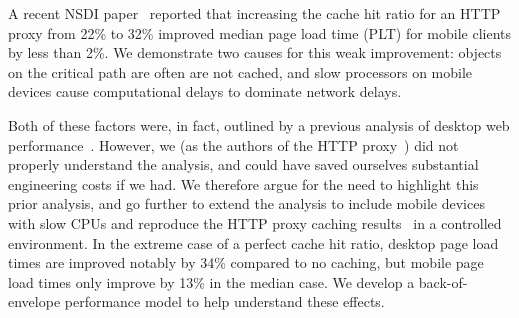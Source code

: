 A recent NSDI paper~\cite{flywheel} reported that
increasing the cache hit ratio for an HTTP proxy from 22\% to 32\% improved
median page load time (PLT) for mobile clients by less than 2\%.
We demonstrate two causes for this weak improvement:
objects on the critical path are often are not cached, and
slow processors on mobile devices cause computational delays to dominate network delays.

Both of
these factors were, in fact, outlined by a previous analysis of desktop
web performance~\cite{wang2013demystifying}. However, we (as the authors of the HTTP proxy~\cite{flywheel}) did not properly understand the analysis, and could have saved ourselves substantial engineering costs if we had. We therefore argue for the need to highlight this prior
analysis, and go further to extend the analysis
to include mobile devices with slow CPUs and reproduce the
HTTP proxy caching
results~\cite{flywheel} in a controlled environment. %
In the extreme case of a perfect cache hit ratio, desktop page load times are
improved notably by 34\% compared to no caching, but mobile page
load times only improve by 13\% in the median case.
We develop a back-of-envelope performance model to help understand these effects.




